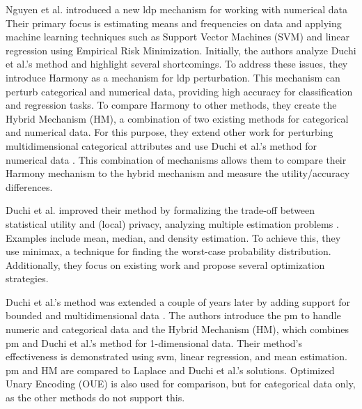 Nguyen et al. introduced a new \gls{ldp} mechanism for working with numerical data \citep{nguyen_collecting_2016}
Their primary focus is estimating means and frequencies on data and applying machine learning techniques such as Support Vector Machines (SVM) and linear regression using Empirical Risk Minimization.
Initially, the authors analyze Duchi et al.'s method \citep{duchi_privacy_2013} and highlight several shortcomings.
To address these issues, they introduce Harmony as a mechanism for \gls{ldp} perturbation.
This mechanism can perturb categorical and numerical data, providing high accuracy for classification and regression tasks.
To compare Harmony to other methods, they create the Hybrid Mechanism (HM), a combination of two existing methods for categorical and numerical data.
For this purpose, they extend other work \citep{bassily_local_2015} for perturbing multidimensional categorical attributes and use Duchi et al.'s method for numerical data \citep{duchi_privacy_2013}.
This combination of mechanisms allows them to compare their Harmony mechanism to the hybrid mechanism and measure the utility/accuracy differences.

Duchi et al. improved their method by formalizing the trade-off between statistical utility and (local) privacy, analyzing multiple estimation problems \citep{duchi_minimax_2017}.
Examples include mean, median, and density estimation.
To achieve this, they use minimax, a technique for finding the worst-case probability distribution.
Additionally, they focus on existing work and propose several optimization strategies.

Duchi et al.'s method was extended a couple of years later by adding support for bounded and multidimensional data \citep{wang_collecting_2019}.
The authors introduce the \gls{pm} to handle numeric and categorical data and the Hybrid Mechanism (HM), which combines \gls{pm} and Duchi et al.'s method for 1-dimensional data.
Their method's effectiveness is demonstrated using \gls{svm}, linear regression, and mean estimation.
\gls{pm} and HM are compared to Laplace and Duchi et al.'s solutions.
Optimized Unary Encoding (OUE) \citep{wang_locally_nodate} is also used for comparison, but for categorical data only, as the other methods do not support this.


